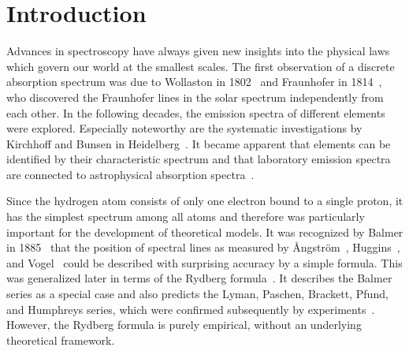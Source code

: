 \chapter*{Introduction}
Advances in spectroscopy have always given new insights into the physical laws which govern our world at the smallest scales.
The first observation of a discrete absorption spectrum was due to Wollaston in 1802~\cite{wollaston1802} and Fraunhofer in 1814~\cite{fraunhofer1817}, who discovered the Fraunhofer lines in the solar spectrum independently from each other.
In the following decades, the emission spectra of different elements were explored. Especially noteworthy are the systematic investigations by Kirchhoff and Bunsen in Heidelberg~\cite{kirchhoff1860,kirchhoff1861}. It became apparent that elements can be identified by their characteristic spectrum and that laboratory emission spectra are connected to astrophysical absorption spectra~\cite{angstrom1862}.

Since the hydrogen atom consists of only one electron bound to a single proton, it has the simplest spectrum among all atoms and therefore was particularly important for the development of theoretical models. It was recognized by Balmer in 1885~\cite{balmer1885} that the position of spectral lines as measured by Ångström~\cite{angstrom1853}, Huggins~\cite{huggins1880}, and Vogel~\cite{vogel1880} could be described with surprising accuracy by a simple formula. This was generalized later in terms of the Rydberg formula~\cite{rydberg1889,martinson2005}. It describes the Balmer series as a special case and also predicts the Lyman, Paschen, Brackett, Pfund, and Humphreys series, which were confirmed subsequently by experiments~\cite{lyman1906,paschen1908,brackett1922,pfund1924,humphrey1953}. However, the Rydberg formula is purely empirical, without an underlying theoretical framework.

